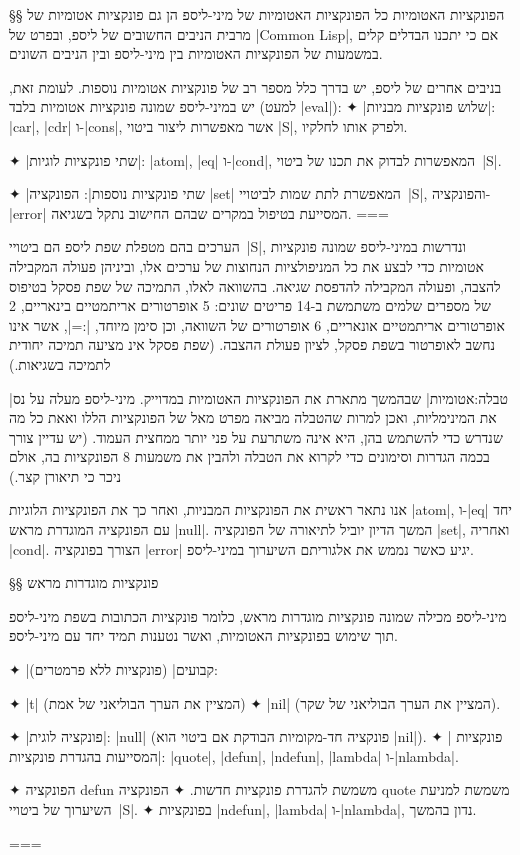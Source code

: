 §§ הפונקציות האטומיות
כל הפונקציות האטומיות של מיני-ליספ הן גם פונקציות אטומיות של מרבית הניבים
החשובים של ליספ, ובפרט של \E|Common Lisp|, אם כי יתכנו הבדלים קלים במשמעות של
הפונקציות האטומיות בין מיני-ליספ ובין הניבים השונים.

בניבים אחרים של ליספ, יש בדרך כלל מספר רב של פונקציות אטומיות נוספות. לעומת
זאת, יש במיני-ליספ שמונה פונקציות אטומיות בלבד (למעט \E|eval|):
✦ \ע|שלוש פונקציות מבניות|: \E|car|, \E|cdr| ו-\E|cons|, אשר מאפשרות ליצור ביטוי
\E|S|, ולפרק אותו לחלקיו.

✦ \ע|שתי פונקציות לוגיות|: \E|atom|, \E|eq| ו-\E|cond|, המאפשרות לבדוק את תכנו של
ביטוי~\E|S|.

✦ \ע|שתי פונקציות נוספות|: הפונקציה \E|set| המאפשרת לתת שמות לביטויי~\E|S|,
והפונקציה-\E|error| המסייעת בטיפול במקרים שבהם החישוב נתקל בשגיאה.
===

הערכים בהם מטפלת שפת ליספ הם ביטויי~\E|S|, ונדרשות במיני-ליספ שמונה פונקציות
אטומיות כדי לבצע את כל המניפולציות הנחוצות של ערכים אלו, וביניהן פעולה המקבילה
להצבה, ופעולה המקבילה להדפסת שגיאה. בהשוואה לאלו, התמיכה של שפת פסקל בטיפוס של
מספרים שלמים משתמשת ב-14 פריטים שונים: 5 אופרטורים אריתמטיים בינאריים, 2
אופרטורים אריתמטיים אונאריים, 6 אופרטורים של השוואה, וכן סימן מיוחד, \E|:=|,
אשר אינו נחשב לאופרטור בשפת פסקל, לציון פעולת ההצבה. (שפת פסקל אינ מציעה תמיכה
יחודית לתמיכה בשגיאות.)

|טבלה:אטומיות| שבהמשך מתארת את הפונקציות האטומיות במדוייק. מיני-ליספ מעלה
על נס את המינימליות, ואכן למרות שהטבלה מביאה מפרט מאל של הפונקציות הללו ואאת כל
מה שנדרש כדי להשתמש בהן, היא אינה משתרעת על פני יותר ממחצית העמוד. (יש עדיין
צורך בכמה הגדרות וסימונים כדי לקרוא את הטבלה ולהבין את משמעות 8 הפונקציות בה,
אולם ניכר כי תיאורן קצר.)

אנו נתאר ראשית את הפונקציות המבניות, ואחר כך את הפונקציות הלוגיות \E|atom|,
ו-\E|eq| יחד עם הפונקציה המוגדרת מראש \E|null|. המשך הדיון יוביל לתיאורה של
הפונקציה \E|set|, ואחריה \E|cond|. הצורך בפונקציה \E|error| יגיע כאשר נממש את
אלגוריתם השיערוך במיני-ליספ.

§§ פונקציות מוגדרות מראש

מיני-ליספ מכילה שמונה פונקציות מוגדרות מראש, כלומר פונקציות הכתובות
בשפת מיני-ליספ תוך שימוש בפונקציות האטומיות, ואשר נטענות תמיד יחד עם
מיני-ליספ.

✦ \ע|קבועים| (פונקציות ללא פרמטרים):
\begin{itemize}
  ✦ \E|t| (המציין את הערך הבוליאני של אמת)
  ✦ \E|nil| (המציין את הערך הבוליאני של שקר).
\end{itemize}
✦ \ע|פונקציה לוגית|: \E|null| (פונקציה חד-מקומיות הבודקת אם ביטוי הוא \E|nil|).
✦ \ע| פונקציות המסייעות בהגדרת פונקציות|:
\E|quote|, \E|defun|, \E|ndefun|, \E|lambda| ו-\E|nlambda|.
\begin{itemize}
  ✦ הפונקציה defun משמשת להגדרת פונקציות חדשות.
  ✦ הפונקציה quote משמשת למניעת השיערוך של ביטויי~\E|S|.
  ✦ בפונקציות \E|ndefun|, \E|lambda| ו-\E|nlambda|, נדון בהמשך.
\end{itemize}
===

